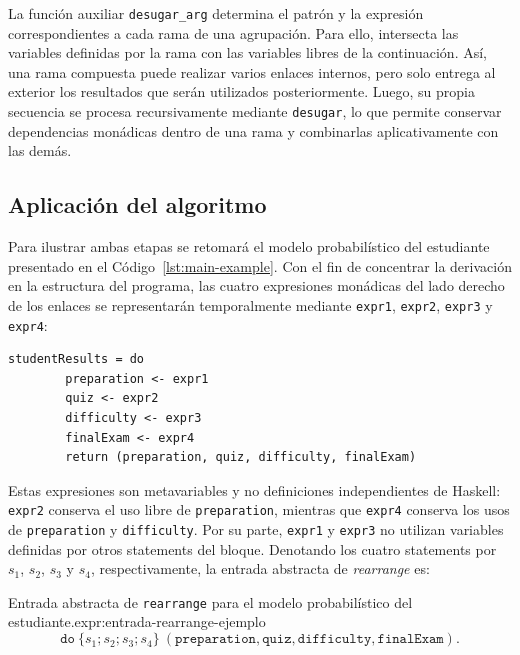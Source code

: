 La función auxiliar \texttt{desugar\_arg} determina el patrón y la expresión correspondientes a cada rama de una agrupación. Para ello, intersecta las variables definidas por la rama con las variables libres de la continuación. Así, una rama compuesta puede realizar varios enlaces internos, pero solo entrega al exterior los resultados que serán utilizados posteriormente. Luego, su propia secuencia se procesa recursivamente mediante \texttt{desugar}, lo que permite conservar dependencias monádicas dentro de una rama y combinarlas aplicativamente con las demás.

\subsection{Aplicación del algoritmo}
\label{sec:applicative-do-aplicacion}

Para ilustrar ambas etapas se retomará el modelo probabilístico del estudiante presentado en el Código~\ref{lst:main-example}. Con el fin de concentrar la derivación en la estructura del programa, las cuatro expresiones monádicas del lado derecho de los enlaces se representarán temporalmente mediante \texttt{expr1}, \texttt{expr2}, \texttt{expr3} y \texttt{expr4}:

\begin{lstlisting}[style=haskell,caption={Representación abreviada del modelo probabilístico para aplicar \texttt{ApplicativeDo}.},label={lst:applicative-do-main-example-abstract}]
    studentResults = do
        preparation <- expr1
        quiz <- expr2
        difficulty <- expr3
        finalExam <- expr4
        return (preparation, quiz, difficulty, finalExam)
\end{lstlisting}

Estas expresiones son metavariables y no definiciones independientes de \textsf{Haskell}: \texttt{expr2} conserva el uso libre de \texttt{preparation}, mientras que \texttt{expr4} conserva los usos de \texttt{preparation} y \texttt{difficulty}. Por su parte, \texttt{expr1} y \texttt{expr3} no utilizan variables definidas por otros statements del bloque. Denotando los cuatro statements por $s_1$, $s_2$, $s_3$ y $s_4$, respectivamente, la entrada abstracta de \textit{rearrange} es:

\begin{ReportExpression}{Entrada abstracta de \texttt{rearrange} para el modelo probabilístico del estudiante.}{expr:entrada-rearrange-ejemplo}
\[
\texttt{do}\ \{s_1;s_2;s_3;s_4\}\
(\texttt{preparation}, \texttt{quiz}, \texttt{difficulty}, \texttt{finalExam}).
\]
\end{ReportExpression}

